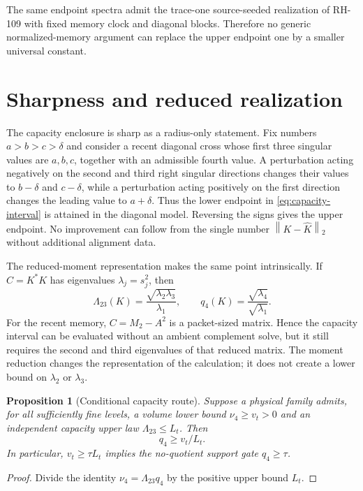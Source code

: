 \documentclass[11pt]{article}
\newtheorem{proposition}[theorem]{Proposition}
\theoremstyle{remark}\newtheorem{remark}[theorem]{Remark}
\newcommand{\norm}[1]{\left\lVert#1\right\rVert}
\begin{document}
The same endpoint spectra admit the trace-one source-seeded realization of
RH-109 with fixed memory clock and diagonal blocks.  Therefore no generic
normalized-memory argument can replace the upper endpoint one by a smaller
universal constant.

\section{Sharpness and reduced realization}
\label{sec:sharpness}

The capacity enclosure is sharp as a radius-only statement.  Fix numbers
$a>b>c>\delta$ and consider a recent diagonal cross whose first three
singular values are $a,b,c$, together with an admissible fourth value.  A
perturbation acting negatively on the second and third right singular
directions changes their values to $b-\delta$ and $c-\delta$, while a
perturbation acting positively on the first direction changes the leading
value to $a+\delta$.  Thus the lower endpoint in
\eqref{eq:capacity-interval} is attained in the diagonal model.  Reversing
the signs gives the upper endpoint.  No improvement can follow from the
single number $\norm{K-\widehat K}_2$ without additional alignment data.

The reduced-moment representation makes the same point intrinsically.  If
$C=K^*K$ has eigenvalues $\lambda_j=s_j^2$, then
\begin{equation}
 \Lambda_{23}(K)=\frac{\sqrt{\lambda_2\lambda_3}}{\lambda_1},
 \qquad
 q_4(K)=\frac{\sqrt{\lambda_4}}{\sqrt{\lambda_1}}.
 \label{eq:capacity-moment}
\end{equation}
For the recent memory, $C=M_2-A^2$ is a packet-sized matrix.  Hence the
capacity interval can be evaluated without an ambient complement solve, but
it still requires the second and third eigenvalues of that reduced matrix.
The moment reduction changes the representation of the calculation; it does
not create a lower bound on $\lambda_2$ or $\lambda_3$.

\begin{proposition}[Conditional capacity route]
\label{prop:conditional}
Suppose a physical family admits, for all sufficiently fine levels, a
volume lower bound $\nu_4\ge v_t>0$ and an independent capacity upper law
$\Lambda_{23}\le L_t$.  Then
\begin{equation}
 q_4\ge v_t/L_t.
 \label{eq:conditional}
\end{equation}
In particular, $v_t\ge\tau L_t$ implies the no-quotient support gate
$q_4\ge\tau$.
\end{proposition}
\begin{proof}
Divide the identity $\nu_4=\Lambda_{23}q_4$ by the positive upper bound
$L_t$.
\end{proof}
\end{document}
